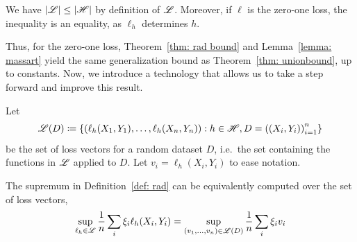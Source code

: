 \documentclass[reqno]{amsart}
\begin{document}
\begin{fact}\label{fact: L H}
  We have $\vert\mathscr{L}\vert \le \vert\mathscr{H}\vert$ by definition of $\mathscr{L}$. Moreover, if $\ell$ is the zero-one loss, the inequality is an equality, as $\ell_h$ determines $h$. 
\end{fact}

Thus, for the zero-one loss, Theorem~\ref{thm: rad bound} and Lemma~\ref{lemma: massart} yield the same generalization bound as Theorem~\ref{thm: unionbound}, up to constants. Now, we introduce a technology that allows us to take a step forward and improve this result. 

Let \[\mathscr{L}(D) \coloneq \left\{\left(\ell_h(X_1,Y_1),\ldots,\ell_h(X_n,Y_n)\right): h \in \mathscr{H}, D = {((X_i, Y_i))}_{i=1}^n \right\}\] be the set of loss vectors for a random dataset $D$, i.e.\ the set containing the functions in $\mathscr{L}$ applied to $D$. Let $v_i = \ell_h(X_i,Y_i)$ to ease notation. 

The supremum in Definition~\ref{def: rad} can be equivalently computed over the set of loss vectors,
\[
\sup_{\ell_h\in\mathscr{L}} \frac{1}{n}\sum_i \xi_i \ell_h(X_i,Y_i) = \sup_{(v_1,\ldots,v_n)\in\mathscr{L}(D)} \frac{1}{n}\sum_i \xi_i v_i
\]
\end{document}
